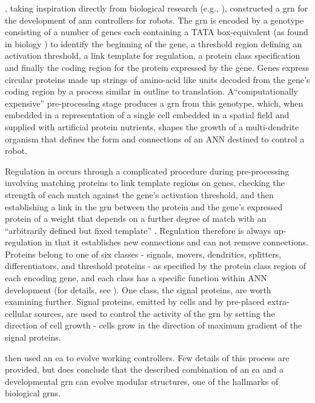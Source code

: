 \cite{Jakobi:1995py}, taking inspiration directly from biological research (e.g., \cite{Kauffman:1969ne}), constructed a \gls{grn} for the development of \gls{ann} controllers for robots. The \gls{grn} is encoded by a genotype consisting of a number of genes each containing a TATA box-equivalent (as found in biology \cite[pg. 397]{Watson:2008fm}) to identify the beginning of the gene, a threshold region defining an activation threshold, a link template for regulation, a protein class specification and finally the coding region for the protein expressed by the gene. Genes express circular proteins made up strings of amino-acid like units decoded from the gene's coding region by a process similar in outline to \gls{translation}.  A``computationally expensive'' \parencite[sec. 4.2]{Jakobi:1995py} pre-processing stage produces a \gls{grn} from this genotype, which, when embedded in a representation of a single cell embedded in a spatial field and supplied with artificial protein nutrients, shapes the growth of a multi-dendrite organism that
defines the form and connections of an ANN destined to control a robot.

Regulation in \cite{Jakobi:1995py} occurs through a complicated procedure during pre-processing involving matching
proteins to link template regions on genes, checking the strength of each match against the gene's activation threshold,
and then establishing a link in the \gls{grn} between the protein and the gene's expressed protein of a weight that depends on
a further degree of match with an ``arbitrarily defined but fixed template'' \parencite[sec. 4.2]{Jakobi:1995py}.
Regulation therefore is always up-regulation in that it establishes new connections and can not remove connections.
Proteins belong to one of six classes - signals, movers, dendritics, splitters, differentiators, and threshold proteins
- as specified by the protein class region of each encoding gene, and each class has a specific function within ANN
development (for details, see \cite[sec. 4.3]{Jakobi:1995py}). One class, the signal proteins, are worth examining
further. Signal proteins, emitted by cells and by pre-placed extra-cellular sources, are used to control the activity of
the \gls{grn} by setting the direction of cell growth - cells grow in the direction of maximum gradient of the signal
proteins.

\cite{Jakobi:1995py} then used an \gls{ea} to evolve working controllers. Few details of this process are
provided, but \cite{Jakobi:1995py} does conclude that the described combination of an \gls{ea} and a developmental
\gls{grn} can evolve modular structures, one of the hallmarks of biological \glspl{grn}.

